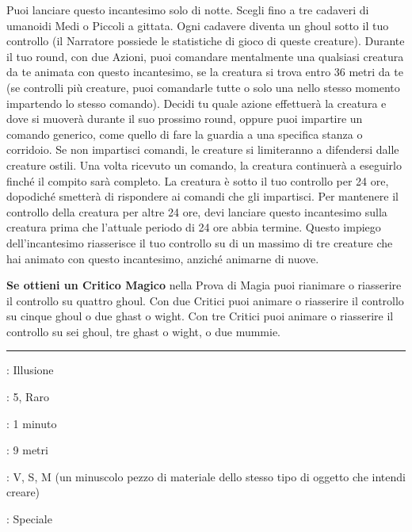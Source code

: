 \begin{multicols}{2}
Puoi lanciare questo incantesimo solo di notte. Scegli fino a tre cadaveri di umanoidi Medi o Piccoli a gittata. Ogni cadavere diventa un ghoul sotto il tuo controllo (il Narratore possiede le statistiche di gioco di queste creature). Durante il tuo round, con due Azioni, puoi comandare mentalmente una qualsiasi creatura da te animata con questo incantesimo, se la creatura si trova entro 36 metri da te (se controlli più creature, puoi comandarle tutte o solo una nello stesso momento impartendo lo stesso comando). Decidi tu quale azione effettuerà la creatura e dove si muoverà durante il suo prossimo round, oppure puoi impartire un comando generico, come quello di fare la guardia a una specifica stanza o corridoio. Se non impartisci comandi, le creature si limiteranno a difendersi dalle creature ostili. Una volta ricevuto un comando, la creatura continuerà a eseguirlo finché il compito sarà completo. La creatura è sotto il tuo controllo per 24 ore, dopodiché smetterà di rispondere ai comandi che gli impartisci. Per mantenere il controllo della creatura per altre 24 ore, devi lanciare questo incantesimo sulla creatura prima che l'attuale periodo di 24 ore abbia termine. Questo impiego dell'incantesimo riasserisce il tuo controllo su di un massimo di tre creature che hai animato con questo incantesimo, anziché animarne di nuove.

\textbf{Se ottieni un Critico Magico} nella Prova di Magia puoi rianimare o riasserire il controllo su quattro ghoul. Con due Critici puoi animare o riasserire il controllo su cinque ghoul o due ghast o wight. Con tre Critici puoi animare o riasserire il controllo su sei ghoul, tre ghast o wight, o due mummie.

\smallskip\noindent\rule{\linewidth}{2pt} \hypertarget{Creazione}{}\medskip{}
\noindent
\begin{description}[noitemsep, topsep=0pt, parsep=0pt, partopsep=0pt, leftmargin=0cm, labelwidth=2.8cm]
	\item[\textbf{Lista di Magia}]: Illusione
	\item[\textbf{Livello}]: 5, Raro
	\item[\textbf{T. di Lancio}]: 1 minuto
	\item[\textbf{Gittata}]: 9 metri
	\item[\textbf{Componenti}]: V, S, M (un minuscolo pezzo di materiale dello stesso tipo di oggetto che intendi creare)
	\item[\textbf{Durata}]: Speciale
\end{description}


\end{multicols}
